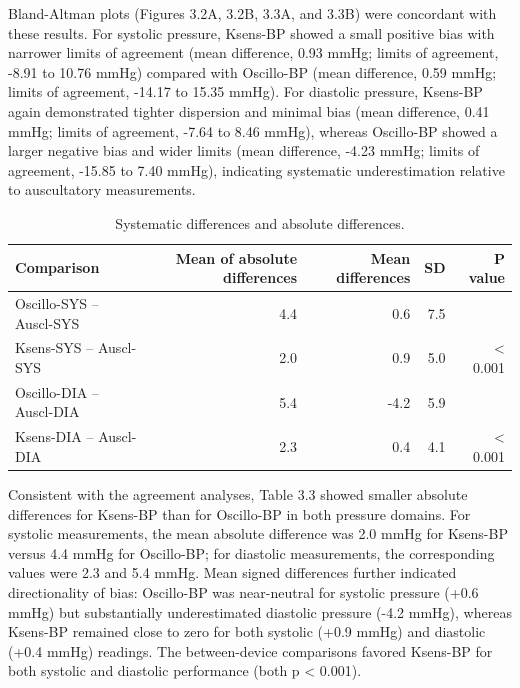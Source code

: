 \documentclass[
  12pt,
  letterpaper,
  openany,
  oneside]{book}
\begin{document}
\FloatBarrier

Bland-Altman plots (Figures 3.2A, 3.2B, 3.3A, and 3.3B) were concordant
with these results. For systolic pressure, Ksens-BP showed a small
positive bias with narrower limits of agreement (mean difference, 0.93
mmHg; limits of agreement, -8.91 to 10.76 mmHg) compared with Oscillo-BP
(mean difference, 0.59 mmHg; limits of agreement, -14.17 to 15.35 mmHg).
For diastolic pressure, Ksens-BP again demonstrated tighter dispersion
and minimal bias (mean difference, 0.41 mmHg; limits of agreement, -7.64
to 8.46 mmHg), whereas Oscillo-BP showed a larger negative bias and
wider limits (mean difference, -4.23 mmHg; limits of agreement, -15.85
to 7.40 mmHg), indicating systematic underestimation relative to
auscultatory measurements.

\begin{table}
\caption{Systematic differences and absolute differences.}\tabularnewline

\fontsize{10.0pt}{13.0pt}\selectfont
\begin{tabular*}{1\linewidth}{@{\extracolsep{\fill}}lrrrr}
\toprule
{\bfseries Comparison} & {\bfseries Mean of
absolute differences} & {\bfseries Mean
differences} & {\bfseries SD} & {\bfseries P value} \\ 
\midrule\addlinespace[2.5pt]
Oscillo-SYS – Auscl-SYS & 4.4 & 0.6 & 7.5 &  \\ 
Ksens-SYS – Auscl-SYS & 2.0 & 0.9 & 5.0 & < 0.001 \\ 
Oscillo-DIA – Auscl-DIA & 5.4 & -4.2 & 5.9 &  \\ 
Ksens-DIA – Auscl-DIA & 2.3 & 0.4 & 4.1 & < 0.001 \\ 
\bottomrule
\end{tabular*}
\end{table}

Consistent with the agreement analyses, Table 3.3 showed smaller
absolute differences for Ksens-BP than for Oscillo-BP in both pressure
domains. For systolic measurements, the mean absolute difference was 2.0
mmHg for Ksens-BP versus 4.4 mmHg for Oscillo-BP; for diastolic
measurements, the corresponding values were 2.3 and 5.4 mmHg. Mean
signed differences further indicated directionality of bias: Oscillo-BP
was near-neutral for systolic pressure (+0.6 mmHg) but substantially
underestimated diastolic pressure (-4.2 mmHg), whereas Ksens-BP remained
close to zero for both systolic (+0.9 mmHg) and diastolic (+0.4 mmHg)
readings. The between-device comparisons favored Ksens-BP for both
systolic and diastolic performance (both p \textless{} 0.001).
\end{document}
